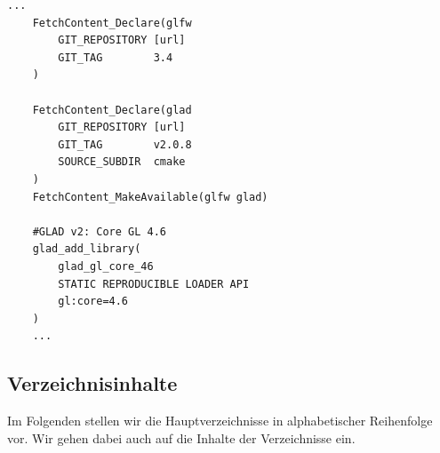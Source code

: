 \vspace{4mm}
\begin{lstlisting}[style=c++style, caption={Ausschnitt aus der CMakeLists.txt des helios Projekts: Dieser Abschnitt deklaiert und bezieht GLFW v3.4 und GLAD v2.0.8 per FetchContent von den jeweiligen Github-Repositories (URLs der Übersicht halber ausgelassen). Im Anschluss wird ein GLAD-Loader für OpenGL 4.6 als statische Bibliothek erzeugt.}, label=lst:cmake]
    ...
    FetchContent_Declare(glfw
        GIT_REPOSITORY [url]
        GIT_TAG        3.4
    )

    FetchContent_Declare(glad
        GIT_REPOSITORY [url]
        GIT_TAG        v2.0.8
        SOURCE_SUBDIR  cmake
    )
    FetchContent_MakeAvailable(glfw glad)

    #GLAD v2: Core GL 4.6
    glad_add_library(
        glad_gl_core_46
        STATIC REPRODUCIBLE LOADER API
        gl:core=4.6
    )
    ...
\end{lstlisting}
\vspace{4mm}

\subsection{Verzeichnisinhalte}

Im Folgenden stellen wir die Hauptverzeichnisse in alphabetischer Reihenfolge vor.
Wir gehen dabei auch auf die Inhalte der Verzeichnisse ein.


